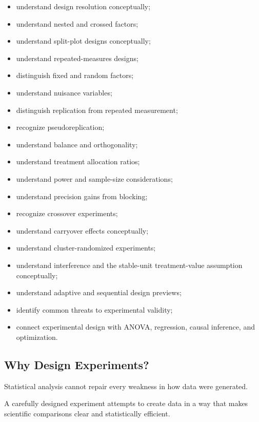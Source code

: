 {\begin{itemize}
    \item understand design resolution conceptually;
    \item understand nested and crossed factors;
    \item understand split-plot designs conceptually;
    \item understand repeated-measures designs;
    \item distinguish fixed and random factors;
    \item understand nuisance variables;
    \item distinguish replication from repeated measurement;
    \item recognize pseudoreplication;
    \item understand balance and orthogonality;
    \item understand treatment allocation ratios;
    \item understand power and sample-size considerations;
    \item understand precision gains from blocking;
    \item recognize crossover experiments;
    \item understand carryover effects conceptually;
    \item understand cluster-randomized experiments;
    \item understand interference and the stable-unit treatment-value
          assumption conceptually;
    \item understand adaptive and sequential design previews;
    \item identify common threats to experimental validity;
    \item connect experimental design with ANOVA, regression, causal
          inference, and optimization.
\end{itemize}
}

\subsection{Why Design Experiments?}
\label{subsec:why-design-experiments}

Statistical analysis cannot repair every weakness in how data were
generated.

A carefully designed experiment attempts to create data in a way that
makes scientific comparisons clear and statistically efficient.

